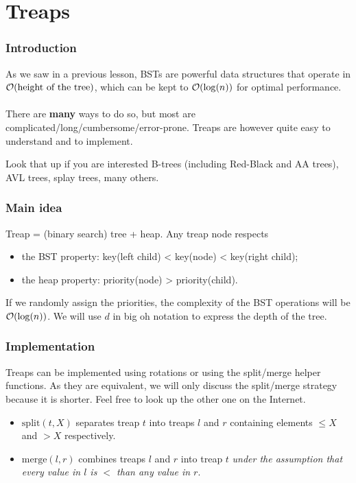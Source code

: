 \section{Treaps}

\begin{frame}
	\frametitle{Introduction}
	As we saw in a previous lesson, BSTs are powerful data structures that operate in $\mathcal O(\text{height of the tree})$, which can be kept to $\mathcal O(\log(n))$ for optimal performance. \\~\\
	
	There are \textbf{many} ways to do so, but most are complicated/long/cumbersome/error-prone.
	Treaps are however quite easy to understand and to implement.
	
	\begin{block}{Look that up if you are interested}
		B-trees (including Red-Black and AA trees), AVL trees, splay trees, many others.
	\end{block}
	
\end{frame}

\begin{frame}
	\frametitle{Main idea}
	Treap = (binary search) tree + heap. Any treap node respects
	\begin{itemize}
		\item the BST property: key(left child) < key(node) < key(right child);
		\item the heap property: priority(node) > priority(child).
	\end{itemize}
	If we randomly assign the priorities, the complexity of the BST operations will be $\mathcal O(\log(n))$. We will use $d$ in big oh notation to express the depth of the tree.
\end{frame}

\begin{frame}
	\frametitle{Implementation}
	Treaps can be implemented using rotations or using the split/merge helper functions.
	As they are equivalent, we will only discuss the split/merge strategy because it is shorter. Feel free to look up the other one on the Internet.
	\begin{itemize}
		\item $\mathrm{split} (t, X)$ separates treap $t$ into treaps $l$ and $r$ containing elements $\le X$ and $> X$ respectively.
		\item $\mathrm{merge} (l, r)$ combines treaps $l$ and $r$ into treap $t$ \textit{under the assumption that every value in $l$ is $<$ than any value in $r$}.
	\end{itemize}
\end{frame}

